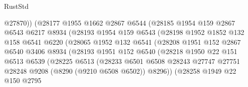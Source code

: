 \begin{lexlean}{RustStd}
\begin{coremodule}
                            @27870))
                        (@28177
                          @1955
                          @1662
                          @2867
                          @6544
                          (@28185
                            @1954
                            @159
                            @2867
                            @6543
                            @6217
                            @8934
                            (@28193
                              @1954
                              @159
                              @6543
                              (@28198
                                @1952
                                @1852
                                @132
                                @158
                                @6541
                                @6220
                                (@28065
                                  @1952
                                  @132
                                  @6541
                                  (@28208
                                    @1951
                                    @152
                                    @2867
                                    @6540
                                    @3406
                                    @8934
                                    (@28193
                                      @1951
                                      @152
                                      @6540
                                      (@28218
                                        @1950
                                        @22
                                        @151
                                        @6513
                                        @6539
                                        (@28225
                                          @6513
                                          (@28233
                                            @6501
                                            @6508
                                            @28243
                                            @27747
                                            @27751
                                            @28248
                                            @9208
                                            (@8290 (@9210 @6508 @6502))
                                            @8296))
                                        (@28258
                                          @1949
                                          @22
                                          @150
                                          @2795

\end{coremodule}
\end{lexlean}
